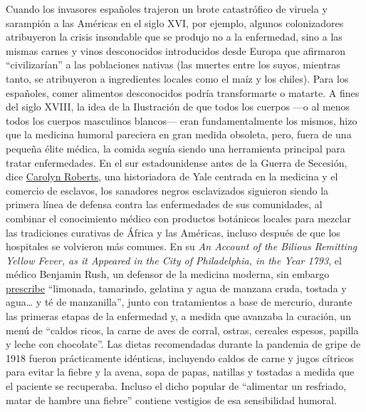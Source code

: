 Cuando los invasores españoles trajeron un brote catastrófico de viruela
y sarampión a las Américas en el siglo XVI, por ejemplo, algunos
colonizadores atribuyeron la crisis insondable que se produjo no a la
enfermedad, sino a las mismas carnes y vinos desconocidos introducidos
desde Europa que afirmaron ``civilizarían'' a las poblaciones nativas
(las muertes entre los suyos, mientras tanto, se atribuyeron a
ingredientes locales como el maíz y los chiles). Para los españoles,
comer alimentos desconocidos podría transformarte o matarte. A fines del
siglo XVIII, la idea de la Ilustración de que todos los cuerpos ---o al
menos todos los cuerpos masculinos blancos--- eran fundamentalmente los
mismos, hizo que la medicina humoral pareciera en gran medida obsoleta,
pero, fuera de una pequeña élite médica, la comida seguía siendo una
herramienta principal para tratar enfermedades. En el sur estadounidense
antes de la Guerra de Secesión, dice
\href{https://afamstudies.yale.edu/people/carolyn-roberts}{Carolyn
Roberts}, una historiadora de Yale centrada en la medicina y el comercio
de esclavos, los sanadores negros esclavizados siguieron siendo la
primera línea de defensa contra las enfermedades de sus comunidades, al
combinar el conocimiento médico con productos botánicos locales para
mezclar las tradiciones curativas de África y las Américas, incluso
después de que los hospitales se volvieron más comunes. En su \emph{An
Account of the Bilious Remitting Yellow Fever, as it Appeared in the
City of Philadelphia, in the Year 1793}, el médico Benjamin Rush, un
defensor de la medicina moderna, sin embargo
\href{https://collections.nlm.nih.gov/catalog/nlm:nlmuid-2569009R-bk}{prescribe}
``limonada, tamarindo, gelatina y agua de manzana cruda, tostada y
agua\ldots{} y té de manzanilla'', junto con tratamientos a base de
mercurio, durante las primeras etapas de la enfermedad y, a medida que
avanzaba la curación, un menú de ``caldos ricos, la carne de aves de
corral, ostras, cereales espesos, papilla y leche con chocolate''. Las
dietas recomendadas durante la pandemia de gripe de 1918 fueron
prácticamente idénticas, incluyendo caldos de carne y jugos cítricos
para evitar la fiebre y la avena, sopa de papas, natillas y tostadas a
medida que el paciente se recuperaba. Incluso el dicho popular de
``alimentar un resfriado, matar de hambre una fiebre'' contiene
vestigios de esa sensibilidad humoral.

